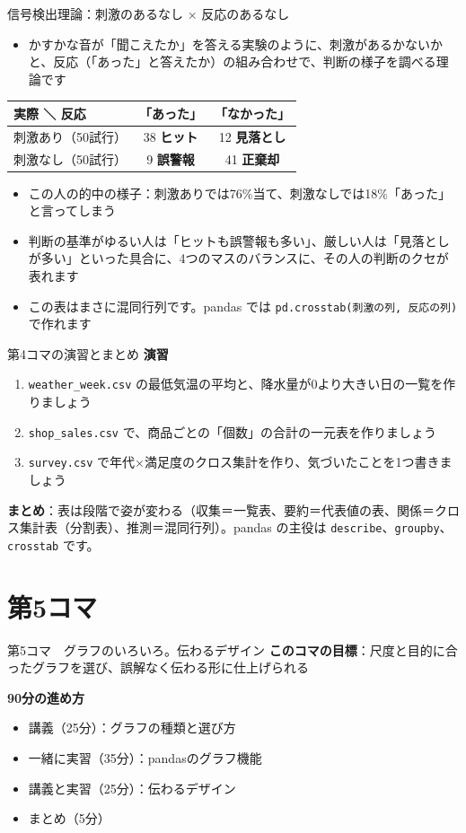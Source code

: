 \documentclass[aspectratio=169,11pt]{beamer}
\newcommand{\sess}[3]{%
\begin{frame}{#1}
\textbf{このコマの目標}：#2

\vspace{0.6em}
\textbf{90分の進め方}
\begin{itemize}
#3
\end{itemize}
\end{frame}}
\begin{document}
\begin{frame}{信号検出理論：刺激のあるなし × 反応のあるなし}
\begin{itemize}
\item かすかな音が「聞こえたか」を答える実験のように、刺激があるかないかと、反応（「あった」と答えたか）の組み合わせで、判断の様子を調べる理論です
\end{itemize}
\begin{center}
\begin{tabular}{lcc}
\toprule
実際 ＼ 反応 & 「あった」 & 「なかった」 \\
\midrule
刺激あり（50試行） & 38 \textbf{ヒット} & 12 \textbf{見落とし} \\
刺激なし（50試行） & 9 \textbf{誤警報} & 41 \textbf{正棄却} \\
\bottomrule
\end{tabular}
\end{center}
\begin{itemize}
\item この人の的中の様子：刺激ありでは76\%当て、刺激なしでは18\%「あった」と言ってしまう
\item 判断の基準がゆるい人は「ヒットも誤警報も多い」、厳しい人は「見落としが多い」といった具合に、4つのマスのバランスに、その人の判断のクセが表れます
\item この表はまさに混同行列です。pandas では \texttt{pd.crosstab(刺激の列, 反応の列)} で作れます
\end{itemize}
\end{frame}

\begin{frame}{第4コマの演習とまとめ}
\textbf{演習}
\begin{enumerate}
\item \texttt{weather\_week.csv} の最低気温の平均と、降水量が0より大きい日の一覧を作りましょう
\item \texttt{shop\_sales.csv} で、商品ごとの「個数」の合計の一元表を作りましょう
\item \texttt{survey.csv} で年代×満足度のクロス集計を作り、気づいたことを1つ書きましょう
\end{enumerate}
\vspace{0.5em}
\textbf{まとめ}：表は段階で姿が変わる（収集＝一覧表、要約＝代表値の表、関係＝クロス集計表（分割表）、推測＝混同行列）。pandas の主役は \texttt{describe}、\texttt{groupby}、\texttt{crosstab} です。
\end{frame}

\section{第5コマ}
\sess{第5コマ　グラフのいろいろ。伝わるデザイン}{尺度と目的に合ったグラフを選び、誤解なく伝わる形に仕上げられる}
{\item 講義（25分）：グラフの種類と選び方
\item 一緒に実習（35分）：pandasのグラフ機能
\item 講義と実習（25分）：伝わるデザイン
\item まとめ（5分）}
\end{document}
